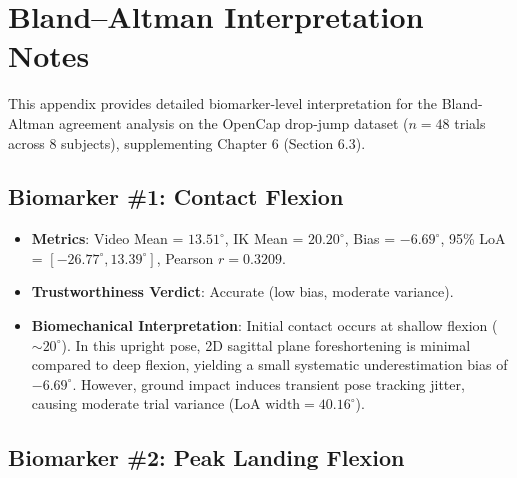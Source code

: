 \chapter{Bland--Altman Interpretation Notes}
\label{app:bland-altman}



This appendix provides detailed biomarker-level interpretation for the Bland-Altman agreement analysis on the OpenCap drop-jump dataset ($n = 48$ trials across 8 subjects), supplementing Chapter 6 (Section 6.3).



\section{Biomarker \protect\#1: Contact Flexion}
\label{sec:d-1-biomarker-protect-1-contact-flexion}

\begin{itemize}
  \item \textbf{Metrics}: Video Mean = $13.51^\circ$, IK Mean = $20.20^\circ$, Bias = $-6.69^\circ$, 95\% LoA = $[-26.77^\circ, 13.39^\circ]$, Pearson $r = 0.3209$.
  \item \textbf{Trustworthiness Verdict}: Accurate (low bias, moderate variance).
  \item \textbf{Biomechanical Interpretation}: Initial contact occurs at shallow flexion ($\sim 20^\circ$). In this upright pose, 2D sagittal plane foreshortening is minimal compared to deep flexion, yielding a small systematic underestimation bias of $-6.69^\circ$. However, ground impact induces transient pose tracking jitter, causing moderate trial variance ($\text{LoA} \text{ width} = 40.16^\circ$).
\end{itemize}



\section{Biomarker \protect\#2: Peak Landing Flexion}
\label{sec:d-2-biomarker-protect-2-peak-landing-flexion}

